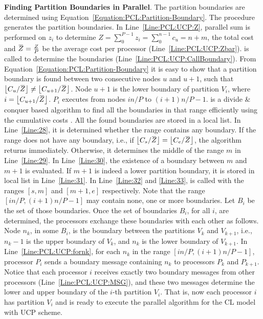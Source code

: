 \documentclass[conference,letterpaper,10pt]{IEEEtran}
\newcommand{\overbar}[1]{\mkern 1.5mu\overline{\mkern-1.5mu#1\mkern-1.5mu}\mkern 1.5mu}
\begin{document}
\vspace{0.5em}
\noindent\textbf{Finding Partition Boundaries in Parallel}. The partition boundaries are determined using Equation~\ref{Equation:PCL:Partition-Boundary}. The  procedure  generates the partition boundaries. In Line~\ref{Line:PCL:UCP:Z}, parallel sum is performed on $z_{i}$ to determine $Z=\sum_{0}^{P-1}z_{i}=\sum_{0}^{n-1}c_{u}=n+m$, the total cost and $\overbar{Z}=\frac{Z}{P}$ be the average cost per processor (Line~\ref{Line:PCL:UCP:Zbar}). 
 is called to determine the boundaries (Line~\ref{Line:PCL:UCP:CallBoundary}).
From  Equation~\ref{Equation:PCL:Partition-Boundary} it is easy to show that a partition boundary is found between two consecutive nodes $u$ and $u+1$, such that ${\left\lfloor C_{u}/\overbar{Z}\right\rfloor} \neq {\left\lfloor C_{u+1}/\overbar{Z}\right\rfloor}$. Node $u+1$ is the lower boundary of partition $V_i$, where $i={\left\lfloor C_{u+1}/\overbar{Z}\right\rfloor}$.
$P_{i}$ executes  from nodes ${in}/{P}$ to ${(i+1)n}/{P}-1$. 
 is a divide \& conquer based algorithm to find all the boundaries in that range efficiently using the cumulative costs . All the found boundaries are stored in a local list. In Line~\ref{Line:28}, it is determined whether the range contains any boundary. If the range does not have any boundary, i.e., if ${\left\lfloor C_{s}/\overbar{Z}\right\rfloor} = {\left\lfloor C_{e}/\overbar{Z}\right\rfloor}$, the algorithm returns immediately. Otherwise, it determines the middle of the range $m$ in Line~\ref{Line:29}. In Line~\ref{Line:30}, the existence of a boundary between $m$ and $m+1$ is evaluated. If $m+1$ is indeed a lower partition boundary, it is stored in local list in Line~\ref{Line:31}. In Line~\ref{Line:32} and \ref{Line:33},  is called with the ranges $[s,m]$ and $[m+1,e]$ respectively.
Note that the range $\left[{in}/{P},{(i+1)n}/{P}-1\right]$ may contain none, one or more boundaries. Let $B_i$ be the set of those boundaries. 
Once the set of boundaries $B_i$, for all $i$, are determined, the processors exchange these boundaries with each other as follows. Node $n_{k}$, in some $B_i$, is the boundary between the partitions $V_k$ and $V_{k+1}$, i.e., $n_{k}-1$ is the upper boundary of $V_k$, and $n_{k}$ is the lower boundary of $V_{k+1}$. In  Line~\ref{Line:PCL:UCP:fornk}, for each $n_k$ in the range $\left[{in}/{P},{(i+1)n}/{P}-1\right]$, processor $P_{i}$ sends a boundary message containing $n_{k}$ to processors $P_{k}$ and $P_{k+1}$. Notice that each processor $i$ receives exactly two boundary messages from other processors (Line~\ref{Line:PCL:UCP:MSG}), and these two messages determine the lower and upper boundary of the $i$-th partition $V_i$. That is, now each processor $i$ has  partition $V_i$ and is ready to execute the parallel algorithm for the CL model with UCP scheme.
\end{document}
